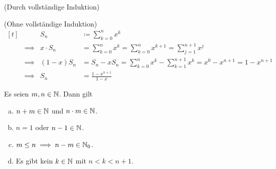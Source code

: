 \documentclass[../ana1.tex]{subfiles}
\begin{document}
\begin{bew} (Durch vollständige Induktion)
\end{bew}
\begin{bew} (Ohne vollständige Induktion)\leavevmode \\
	\[\begin{aligned}[t]
			&        & S_n         & \coloneqq \sum_{k = 0}^{n} x^k \\
			&\implies& x \cdot S_n & = \sum_{k = 0}^{n} x^k = \sum_{k = 0}^{n} x^{k + 1} = \sum_{j = 1}^{n + 1} x^j \\
			&\implies& (1 - x)S_n  & = S_n - x S_n = \sum_{k = 0}^{n} x^k - \sum_{k = 1}^{n + 1} x^k = x^0 - x^{n + 1} = 1 - x^{n + 1} \\
			&\implies& S_n         & = \frac{1 - x^{n + 1}}{1 - x}
	  \end{aligned} \]
\end{bew}

\begin{satz}\label{satz:prop_N}
	Es seien \(m , n \in \mathbb{N} \). Dann gilt
	\begin{enumerate}[(a)]
		\item \(n + m \in \mathbb{N} \) und \(n \cdot m \in \mathbb{N} \).
		\item \(n = 1 \) oder \(n - 1 \in \mathbb{N} \).
		\item \(m \leq n \implies n - m \in \mathbb{N}_{0} \).
		\item Es gibt kein \(k \in \mathbb{N} \) mit \(n < k < n + 1 \).
	\end{enumerate}
\end{satz}

\iftoggle{short}{}{\newpage}%
\end{document}
